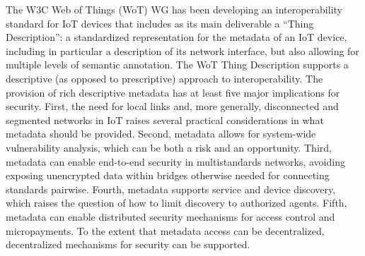 The W3C Web of Things (WoT) WG has been developing an interoperability standard for IoT devices that includes as
its main deliverable a ``Thing Description'': a standardized representation for the metadata of an 
IoT device, including in particular a description of its network interface,
but also allowing for multiple levels of semantic annotation.
The WoT Thing Description supports a descriptive (as opposed to prescriptive) approach to interoperability.
The provision of rich descriptive metadata has at least five major implications for security.
First, the need for local links and, more generally, disconnected and segmented networks
       in IoT raises several practical considerations in what metadata should be provided.
Second, metadata allows for system-wide vulnerability analysis, 
       which can be both a risk and an opportunity.
Third, metadata can enable end-to-end security in multistandards networks,
       avoiding exposing unencrypted data within bridges otherwise needed for connecting standards pairwise.
Fourth, metadata supports service and device discovery,
       which raises the question of how to limit discovery to authorized agents.
Fifth, metadata can enable distributed security mechanisms for access control and micropayments.
       To the extent that metadata access can be decentralized, decentralized mechanisms for security can
       be supported.
